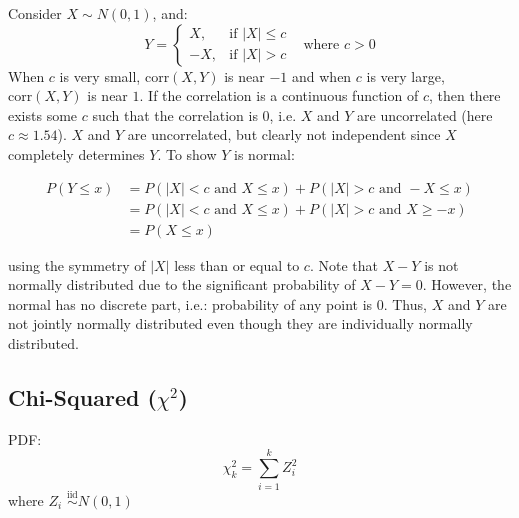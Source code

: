 \documentclass[DIV=14,titlepage=false]{scrreprt}
\begin{document}
\begin{example} Consider $X \sim N(0,1)$, and: \[
  Y= 
\begin{cases}
  X,& \text{if } |X| \leq c\\
  -X,& \text{if } |X| > c
\end{cases}
\hspace{10pt}
\text{where $c>0$}
\]
When \( c \) is very small, \( \text{corr}(X, Y) \) is near \(-1\) and when \( c \) is very large, \( \text{corr}(X, Y) \) is near \( 1 \). If the correlation is a continuous function of \( c \), then there exists some \( c \) such that the correlation is \( 0 \), i.e. $X$ and $Y$ are uncorrelated (here $c \approx 1.54$). $X$ and $Y$ are uncorrelated, but clearly not independent since $X$ completely determines $Y$. To show $Y$ is normal:

\[
\begin{aligned}
P(Y \leq x) &= P(|X| < c \text{ and } X \leq x) + P(|X| > c \text{ and } -X \leq x) \\
&= P(|X| < c \text{ and } X \leq x) + P(|X| > c \text{ and } X \geq -x) \\
&= P(X \leq x)
\end{aligned}
\]

using the symmetry of \( |X| \) less than or equal to \( c \). Note that \( X - Y \) is not normally distributed due to the significant probability of \( X - Y = 0 \). However, the normal has no discrete part, i.e.: probability of any point is 0. Thus, \( X \) and \( Y \) are not jointly normally distributed even though they are individually normally distributed.
\end{example}

\subsection*{Chi-Squared (\(\chi^2\))}
PDF: \[ \displaystyle \chi^2_k = \sum_{i=1}^k Z_i^2 \] where \( Z_i \) $\overset{\mathrm{iid}}{\sim}N(0,1)$
\end{document}
